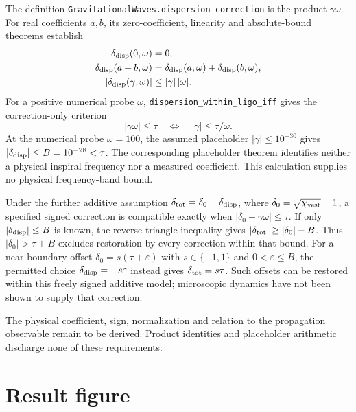 \documentclass[aps,prd,twocolumn,showpacs,superscriptaddress,nofootinbib]{revtex4-2}
\newcommand{\chivest}{\chi_{\rm vest}}
\begin{document}
The definition
\texttt{GravitationalWaves.\allowbreak dispersion\_\allowbreak correction}
is the product $\gamma\omega$. For real coefficients $a,b$,
its zero-coefficient, linearity and
absolute-bound theorems establish
\begin{align}
\delta_{\rm disp}(0,\omega)&=0,\\
\delta_{\rm disp}(a+b,\omega)
 &=\delta_{\rm disp}(a,\omega)
   +\delta_{\rm disp}(b,\omega),\\
|\delta_{\rm disp}(\gamma,\omega)|&\leq|\gamma|\,|\omega|.
\end{align}
For a positive numerical probe $\omega$,
\texttt{dispersion\_within\_ligo\_iff} gives the correction-only criterion
\begin{equation}
|\gamma\omega|\leq\tau
\quad\Longleftrightarrow\quad
|\gamma|\leq\tau/\omega .
\end{equation}
At the numerical probe $\omega=100$, the assumed placeholder
$|\gamma|\leq10^{-30}$ gives
$|\delta_{\rm disp}|\leq B=10^{-28}<\tau$.
The corresponding placeholder theorem identifies neither a physical
inspiral frequency nor a measured coefficient. This calculation
supplies no physical frequency-band bound.

Under the further additive assumption
$\delta_{\rm tot}=\delta_0+\delta_{\rm disp}$, where
$\delta_0=\sqrt{\chivest}-1$, a specified signed correction is
compatible exactly when $|\delta_0+\gamma\omega|\leq\tau$.
If only $|\delta_{\rm disp}|\leq B$ is known, the reverse triangle
inequality gives $|\delta_{\rm tot}|\geq|\delta_0|-B$.
Thus $|\delta_0|>\tau+B$ excludes restoration by every correction
within that bound. For a near-boundary offset
$\delta_0=s(\tau+\varepsilon)$ with $s\in\{-1,1\}$ and
$0<\varepsilon\leq B$, the permitted choice
$\delta_{\rm disp}=-s\varepsilon$ instead gives
$\delta_{\rm tot}=s\tau$. Such offsets can be restored within
this freely signed additive model; microscopic dynamics have not
been shown to supply that correction.

The physical coefficient, sign, normalization and relation to the
propagation observable remain to be derived. Product identities and
placeholder arithmetic discharge none of these requirements.

\section{Result figure}
\label{sec:figure}
\end{document}
